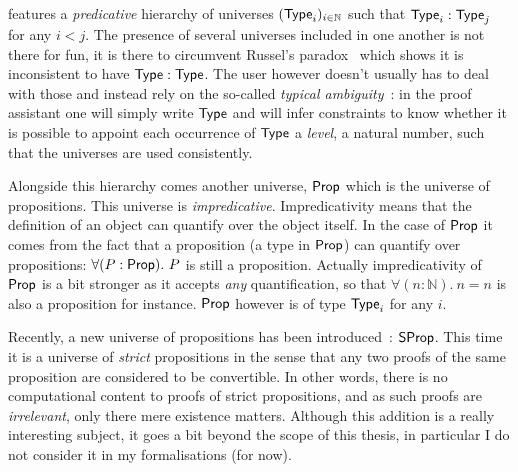 \Coq features a \emph{predicative} hierarchy of universes
\((\mathsf{Type}_i)_{i \in \mathbb{N}}\) such that \(\mathsf{Type}_i : \mathsf{Type}_j\) for any
\(i < j\). The presence of several universes included in one another is not
there for fun, it is there to circumvent Russel's paradox~\misref{} which
shows it is inconsistent to have \(\mathsf{Type} : \mathsf{Type}\).
The \Coq user however doesn't usually has to deal with those and
instead rely on the so-called \emph{typical ambiguity}~\misref{}: in the \Coq
proof assistant one will simply write \(\mathsf{Type}\) and \Coq will infer constraints
to know whether it is possible to appoint each occurrence of \(\mathsf{Type}\) a
\emph{level}, \ie a natural number, such that the universes are used
consistently.

Alongside this hierarchy comes another universe, \(\mathsf{Prop}\) which is the universe
of propositions. This universe is \emph{impredicative}.
Impredicativity means that the definition of an object can quantify over the
object itself. In the case of \(\mathsf{Prop}\) it comes from the fact that a
proposition (\ie a type in \(\mathsf{Prop}\)) can quantify over propositions: \eg
\(\forall (P : \mathsf{Prop}).\ P\) is still a proposition.
Actually impredicativity of \(\mathsf{Prop}\) is a bit stronger as it accepts \emph{any}
quantification, so that \(\forall (n : \mathbb{N}).\ n = n\) is also a
proposition for instance.
\(\mathsf{Prop}\) however is of type \(\mathsf{Type}_i\) for any \(i\).

Recently, a new universe of propositions has been introduced~\misref:
\(\mathsf{SProp}\). This time it is a universe of \emph{strict} propositions in the
sense that any two proofs of the same proposition are considered to be
convertible.
In other words, there is no computational content to proofs of strict
propositions, and as such proofs are \emph{irrelevant}, only there mere
existence matters.
Although this addition is a really interesting subject, it goes a bit beyond
the scope of this thesis, in particular I do not consider it in my
formalisations (for now).

